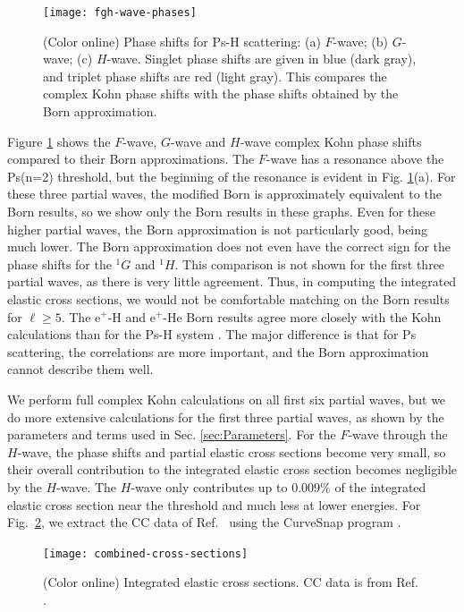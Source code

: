 \documentclass[preprint,showpacs,showkeys,preprintnumbers,amsmath,amssymb,longbibliography,pra,aps]{revtex4-1}
\begin{document}
\begin{figure}[H]
	\centering
	\texttt{[image: fgh-wave-phases]}
	\caption{(Color online) Phase shifts for Ps-H scattering:
(a) $F$-wave; (b) $G$-wave; (c) $H$-wave. Singlet phase shifts are given in blue
(dark gray), and triplet phase shifts are red (light gray). This compares the
complex Kohn phase shifts with the phase shifts obtained by the Born
approximation.}
	\label{fig:fgh-wave-phases}
\end{figure}

Figure \ref{fig:fgh-wave-phases} shows the $F$-wave, $G$-wave and $H$-wave 
complex Kohn phase shifts compared to their Born approximations. The $F$-wave 
has a resonance above the Ps(n=2) threshold, but the beginning of the 
resonance is evident in Fig. \ref{fig:fgh-wave-phases}(a). For these three 
partial waves, the modified Born is approximately equivalent to the Born 
results, so we show only the Born results in these graphs. Even for these 
higher partial waves, the Born approximation is not particularly good, being 
much lower. The Born approximation does not even have the correct sign for 
the phase shifts for the $^1G$ and $^1H$. This comparison is not shown for 
the first three partial waves, as there is very little agreement. Thus, in
computing the integrated elastic cross sections, we would not be comfortable
matching on the Born results for $\ell \geq 5$.
The e$^+$-H 
and e$^+$-He Born results agree more closely with the Kohn calculations than 
for the Ps-H system \cite{VanReeth2014}. The major difference is that for Ps 
scattering, the correlations are more important, and the Born approximation 
cannot describe them well. 

We perform full complex Kohn calculations on all first six partial waves, but 
we do more extensive calculations for the first three partial waves, as shown 
by the parameters and terms used in Sec. \ref{sec:Parameters}. For the
$F$-wave through the $H$-wave, the phase shifts and partial elastic cross 
sections become very small, so their overall contribution to the integrated 
elastic cross section becomes negligible by the $H$-wave. The $H$-wave only 
contributes up to $0.009\%$ of the integrated elastic cross section near the 
threshold and much less at lower energies. For
Fig.~\ref{fig:combined-cross-sections}, we extract the CC data of
Ref.~\cite{Walters2004} using the CurveSnap program \cite{CurveSnap}.

\begin{figure}[H]
	\centering
	\texttt{[image: combined-cross-sections]}
	\caption{(Color online) Integrated elastic cross sections. CC data is from
Ref. \cite{Walters2004}.}
	\label{fig:combined-cross-sections}
\end{figure}
\end{document}
